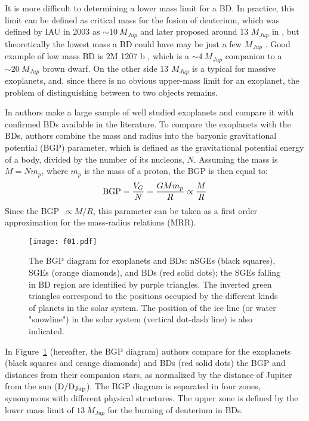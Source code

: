It is more difficult to determining a lower mass limit for a BD. 
In practice, this limit can be defined as critical mass for the fusion of deuterium, which was defined by IAU in 2003 
as $\sim 10~M_{Jup}$ and later proposed around 13 $M_{Jup}$ in \cite{Bate2006},
but theoretically the lowest mass a BD could have may be just a few $M_{Jup}$ 
\citep{Larson1969,Silk1977,Boss1988}.
Good example of low mass BD is 
2M 1207 b \citep{Chauvin2005}, which is a $\sim 4~ M_{Jup}$ companion to a $\sim 20~ M_{Jup}$ brown dwarf. 
On the other side 13 $M_{Jup}$ is a typical for massive exoplanets, and, since there is no obvious upper-mass limit for an exoplanet, 
the problem of distinguishing between to two objects remains.

In \cite{Torres2016} authors make a large sample of well studied exoplanets and compare it with confirmed BDs available in the literature.
To compare the exoplanets with the BDs, authors combine the mass and radius 
into the baryonic gravitational potential (BGP) parameter, which is defined as the gravitational 
potential energy of a body, divided by the number of its nucleons, $N$. 
Assuming the mass is $M = N m_p$, where $m_p$ is the mass of a proton, the BGP is then equal to:
\begin{equation}
{\rm BGP} = \frac{V_G}{N} = \frac{G M m_p}{R} \propto \frac{M}{R}
\end{equation}
Since the BGP\ $ \propto M/R$, this parameter can be taken as 
a first order approximation for the mass-radius relations (MRR). 

\begin{figure}[!ht]
\centering
\texttt{[image: f01.pdf]}
\caption{The BGP diagram for exoplanets and BDs: nSGEs (black squares), SGEs (orange diamonds),  and BDs (red solid dots); the SGEs falling in BD region are identified by purple triangles. The inverted green triangles correspond to the positions occupied by the different kinds of planets in the solar system. The position of the ice line (or water "snowline") in the solar system (vertical dot-dash line) is also indicated. \citep{Torres2016}}
\label{fig:figTor1}
\end{figure}

In Figure~\ref{fig:figTor1} (hereafter, the BGP diagram) authors compare for the exoplanets (black squares and orange diamonds) and BDs (red solid dots) the BGP and distances from their companion stars, as normalized by the distance of Jupiter from the sun (${\rm D}/{\rm D_{Jup}}$). The BGP diagram is separated in four zones, synonymous with different physical structures. The upper zone is defined by the lower mass limit of $13\ M_{Jup}$ for the burning of deuterium in BDs. 


